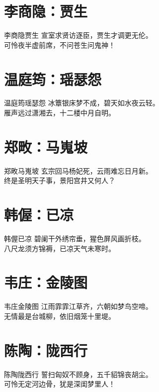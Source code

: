 \documentclass[12pt,oneside,a5paper]{book}
\begin{document}
\chapter{李商隐：贾生}
\begin{poemzh}{李商隐}{贾生}
宣室求贤访逐臣，贾生才调更无伦。\\
可怜夜半虚前席，不问苍生问鬼神！\\ 
\end{poemzh}

\chapter{温庭筠：瑶瑟怨}
\begin{poemzh}{温庭筠}{瑶瑟怨}
冰簟银床梦不成，碧天如水夜云轻。\\
雁声远过潇湘去，十二楼中月自明。\\ 
\end{poemzh}

\chapter{郑畋：马嵬坡}
\begin{poemzh}{郑畋}{马嵬坡}
玄宗回马杨妃死，云雨难忘日月新。\\
终是圣明天子事，景阳宫井又何人？\\ 
\end{poemzh}

\chapter{韩偓：已凉}
\begin{poemzh}{韩偓}{已凉}
碧阑干外绣帘垂，猩色屏风画折枝。\\
八尺龙须方锦褥，已凉天气未寒时。\\ 
\end{poemzh}

\chapter{韦庄：金陵图}
\begin{poemzh}{韦庄}{金陵图}
江雨霏霏江草齐，六朝如梦鸟空啼。\\
无情最是台城柳，依旧烟笼十里堤。\\ 
\end{poemzh}

\chapter{陈陶：陇西行}
\begin{poemzh}{陈陶}{陇西行}
誓扫匈奴不顾身，五千貂锦丧胡尘。\\
可怜无定河边骨，犹是深闺梦里人！\\ 
\end{poemzh}
\end{document}
